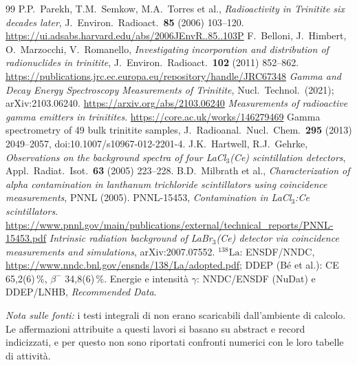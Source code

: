 \documentclass[11pt,a4paper]{article}
\newcommand{\nuc}[2]{\ensuremath{{}^{#1}\mathrm{#2}}}
\newcommand{\gam}{$\gamma$}
\begin{document}
\begin{thebibliography}{99}\small
{} P.P.~Parekh, T.M.~Semkow, M.A.~Torres et al., \emph{Radioactivity in Trinitite six decades later}, J.~Environ.\ Radioact.\ \textbf{85} (2006) 103--120. \url{https://ui.adsabs.harvard.edu/abs/2006JEnvR..85..103P}
 F.~Belloni, J.~Himbert, O.~Marzocchi, V.~Romanello, \emph{Investigating incorporation and distribution of radionuclides in trinitite}, J.~Environ.\ Radioact.\ \textbf{102} (2011) 852--862. \url{https://publications.jrc.ec.europa.eu/repository/handle/JRC67348}
 \emph{Gamma and Decay Energy Spectroscopy Measurements of Trinitite}, Nucl.\ Technol.\ (2021); arXiv:2103.06240. \url{https://arxiv.org/abs/2103.06240}
 \emph{Measurements of radioactive gamma emitters in trinitites}. \url{https://core.ac.uk/works/146279469}
 Gamma spectrometry of 49 bulk trinitite samples, J.~Radioanal.\ Nucl.\ Chem.\ \textbf{295} (2013) 2049--2057, doi:10.1007/s10967-012-2201-4.
 J.K.~Hartwell, R.J.~Gehrke, \emph{Observations on the background spectra of four LaCl$_3$(Ce) scintillation detectors}, Appl.\ Radiat.\ Isot.\ \textbf{63} (2005) 223--228.
 B.D.~Milbrath et al., \emph{Characterization of alpha contamination in lanthanum trichloride scintillators using coincidence measurements}, PNNL (2005).
 PNNL-15453, \emph{Contamination in LaCl$_3$:Ce scintillators}. \url{https://www.pnnl.gov/main/publications/external/technical_reports/PNNL-15453.pdf}
 \emph{Intrinsic radiation background of LaBr$_3$(Ce) detector via coincidence measurements and simulations}, arXiv:2007.07552.
 \nuc{138}{La}: ENSDF/NNDC, \url{https://www.nndc.bnl.gov/ensnds/138/La/adopted.pdf}; DDEP (Bé et al.): CE 65,2(6)\,\%, $\beta^-$ 34,8(6)\,\%.
 Energie e intensità \gam: NNDC/ENSDF (NuDat) e DDEP/LNHB, \emph{Recommended Data}.
\end{thebibliography}

\noindent\footnotesize\textit{Nota sulle fonti:} i testi integrali di \cite{parekh2006,belloni2011,nist2021,core,jrnc2013} non erano scaricabili dall'ambiente di calcolo. Le affermazioni attribuite a questi lavori si basano su abstract e record indicizzati, e per questo non sono riportati confronti numerici con le loro tabelle di attività.
\end{document}

